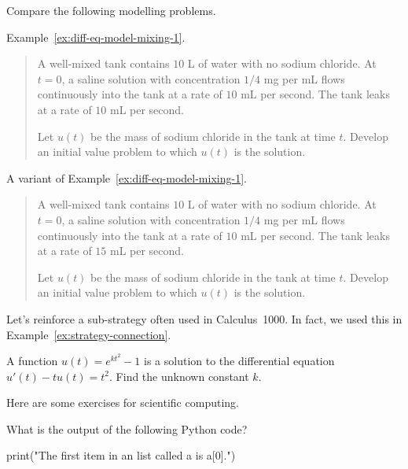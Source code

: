 \documentclass[../main.tex]{subfiles}
\begin{document}
\begin{example}
  Compare the following modelling problems. 

  Example~\ref{ex:diff-eq-model-mixing-1}.
  \begin{quote}
    A well-mixed tank contains \(10\) L of water with no sodium chloride. At \(t = 0\), a saline solution with concentration \(1/4\) mg per mL flows continuously into the tank at a rate of \(10\) mL per second. The tank leaks at a rate of \(10\) mL per second. 

    Let \(u(t)\) be the mass of sodium chloride in the tank at time \(t\). Develop an initial value problem to which \(u(t)\) is the solution.
  \end{quote}


  A variant of Example~\ref{ex:diff-eq-model-mixing-1}.
  \begin{quote}
    A well-mixed tank contains \(10\) L of water with no sodium chloride. At \(t = 0\), a saline solution with concentration \(1/4\) mg per mL flows continuously into the tank at a rate of \(10\) mL per second. The tank leaks at a rate of \(15\) mL per second. 

    Let \(u(t)\) be the mass of sodium chloride in the tank at time \(t\). Develop an initial value problem to which \(u(t)\) is the solution.
  \end{quote}

  \blanks*
\end{example}
\clearpage

Let's reinforce a sub-strategy often used in Calculus~1000.  In fact, we used this in Example~\ref{ex:strategy-connection}. 

\begin{example}
  A function \(u(t) = e^{kt^{2}} - 1\) is a solution to the differential equation \(u'(t) - tu(t) = t^{2}\).  Find the unknown constant \(k\).

  \blanks*
\end{example}

\clearpage
Here are some exercises for scientific computing.
\begin{example}
  What is the output of the following Python code?

  \begin{pythoncode}
print("The first item in an list called a is a[0].")
  \end{pythoncode}
\end{example}
\end{document}
